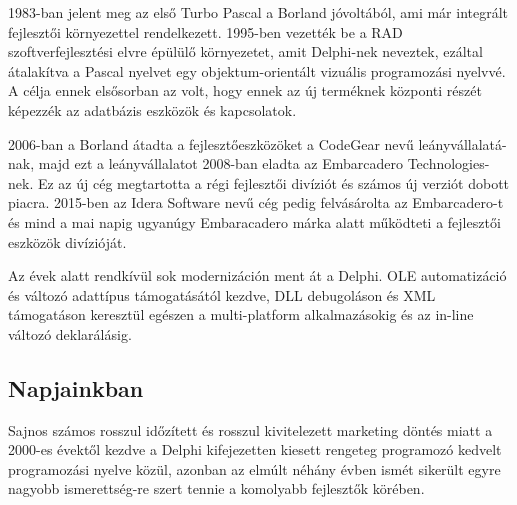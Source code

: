1983-ban jelent meg az első Turbo Pascal a Borland jóvoltából, ami már integrált fejlesztői környezettel rendelkezett. 1995-ben vezették be a RAD szoftverfejlesztési elvre épülülő környezetet, amit Delphi-nek neveztek, ezáltal átalakítva a Pascal nyelvet egy objektum-orientált vizuális programozási nyelvvé. A célja ennek elsősorban az volt, hogy ennek az új terméknek központi részét képezzék az adatbázis eszközök és kapcsolatok.

2006-ban a Borland átadta a fejlesztőeszközöket a CodeGear nevű leányvállalatá\hyp{}nak, majd ezt a leányvállalatot 2008-ban eladta az Embarcadero Technologies-nek. Ez az új cég megtartotta a régi fejlesztői divíziót és számos új verziót dobott piacra. 2015-ben az Idera Software nevű cég pedig felvásárolta az Embarcadero-t és mind a mai napig ugyanúgy Embaracadero márka alatt működteti a fejlesztői eszközök divízióját.

Az évek alatt rendkívül sok modernizáción ment át a Delphi. OLE automatizáció és változó adattípus támogatásától kezdve, DLL debugoláson és XML támogatáson keresztül egészen a multi-platform alkalmazásokig és az in-line változó deklarálásig.

\textit{\cite{delphi:002}}

\subsection{Napjainkban}

Sajnos számos rosszul időzített és rosszul kivitelezett marketing döntés miatt a 2000-es évektől kezdve a Delphi kifejezetten kiesett rengeteg programozó kedvelt programozási nyelve közül, azonban az elmúlt néhány évben ismét sikerült egyre nagyobb ismerettség\hyp{}re szert tennie a komolyabb fejlesztők körében.

